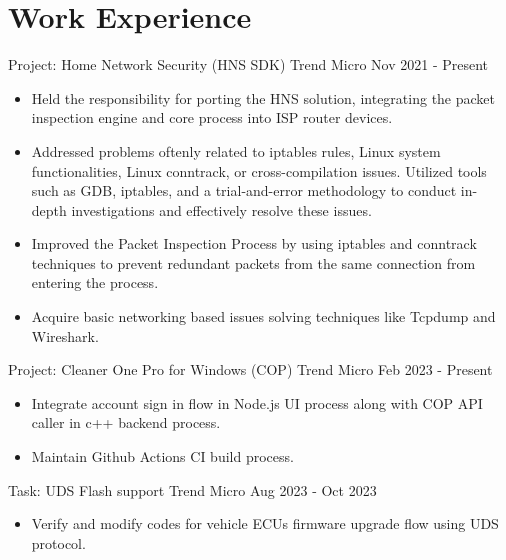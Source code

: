 \section{Work Experience}

{Project: Home Network Security (HNS SDK)}
{Trend Micro}
{Nov 2021 - Present}
\begin{itemize}
  \item Held the responsibility for porting the HNS solution, integrating the packet inspection engine and core process into ISP router devices.
  \item Addressed problems oftenly related to iptables rules, Linux system functionalities, Linux conntrack, or cross-compilation issues. Utilized tools such as GDB, iptables, and a trial-and-error methodology to conduct in-depth investigations and effectively resolve these issues.
  \item Improved the Packet Inspection Process by using iptables and conntrack techniques to prevent redundant packets from the same connection from entering the process.
  \item Acquire basic networking based issues solving techniques like Tcpdump and Wireshark.
\end{itemize}

{Project: Cleaner One Pro for Windows (COP)}
{Trend Micro}
{Feb 2023 - Present}
\begin{itemize}
  \setlength\topsep{0em}
  \setlength\parskip{0em}
  \setlength\parsep{0em}
  \setlength\itemsep{0em}
  \item Integrate account sign in flow in Node.js UI process along with COP API caller in c++ backend process.
  \item Maintain Github Actions CI build process.
\end{itemize}

{Task: UDS Flash support}
{Trend Micro}
{Aug 2023 - Oct 2023}
\begin{itemize}
  \setlength\topsep{0em}
  \setlength\parskip{0em}
  \setlength\parsep{0em}
  \setlength\itemsep{0em}
  \item Verify and modify codes for vehicle ECUs firmware upgrade flow using UDS protocol.
\end{itemize}
